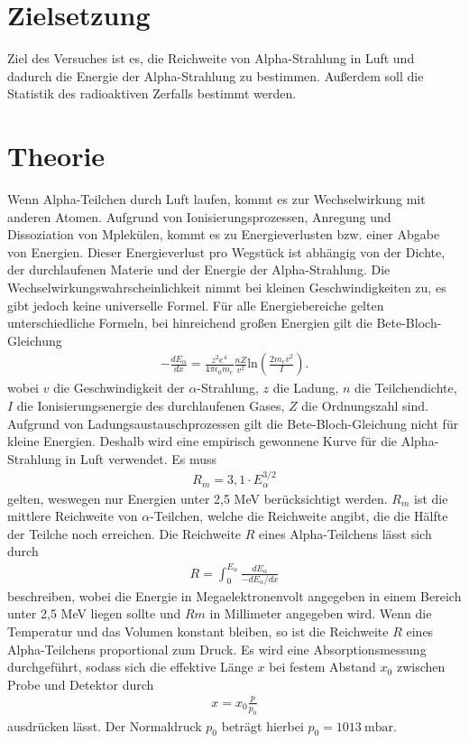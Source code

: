 \section{Zielsetzung}
\label{sec:Zielsetzung}

Ziel des Versuches ist es, die Reichweite von Alpha-Strahlung in Luft und dadurch die Energie der Alpha-Strahlung zu bestimmen.
Außerdem soll die Statistik des radioaktiven Zerfalls bestimmt werden.

\section{Theorie}
\label{sec:Theorie}

Wenn Alpha-Teilchen durch Luft laufen, kommt es zur Wechselwirkung mit anderen Atomen. Aufgrund von Ionisierungsprozessen, Anregung
und Dissoziation von Mplekülen, kommt es zu Energieverlusten bzw. einer Abgabe von Energien.
Dieser Energieverlust pro Wegstück ist abhängig von der Dichte, der durchlaufenen Materie und der Energie der Alpha-Strahlung.
Die Wechselwirkungswahrscheinlichkeit nimmt bei kleinen Geschwindigkeiten zu, es gibt jedoch keine universelle Formel.
Für alle Energiebereiche gelten unterschiedliche Formeln, bei hinreichend großen Energien gilt die Bete-Bloch-Gleichung
\begin{align}
    -\frac{dE_\alpha}{dx} = \frac{z^2e^4}{4 \pi \epsilon_0 m_e}\frac{nZ}{v^2}\text{ln}\left(\frac{2 m_e v^2}{I}\right).\label{eqn:Bete}
\end{align}
wobei $v$ die Geschwindigkeit der $\alpha$-Strahlung, $z$ die Ladung, $n$ die Teilchendichte, $I$ die Ionisierungsenergie des durchlaufenen Gases, $Z$ die Ordnungszahl sind.
Aufgrund von Ladungsaustauschprozessen gilt die Bete-Bloch-Gleichung nicht für kleine Energien.
Deshalb wird eine empirisch gewonnene Kurve für die Alpha-Strahlung in Luft verwendet.
Es muss
\begin{align}
   R_m=3,1 \cdot E_{\alpha}^{3/2} \label{eqn:Energiereichweite}
\end{align}
gelten, weswegen nur Energien unter 2,5 MeV berücksichtigt werden.
$R_m$ ist die mittlere Reichweite von $\alpha$-Teilchen, welche die Reichweite angibt, die die Hälfte der Teilche noch erreichen.
Die Reichweite $R$ eines Alpha-Teilchens lässt sich durch
\begin{align}
  R=  \int_0^{E_\alpha} \frac{dE_\alpha}{-dE_\alpha/dx} \label{eqn:Reichweite}
\end{align} 
beschreiben, wobei die Energie in Megaelektronenvolt angegeben in einem Bereich unter 2,5 MeV
liegen sollte und $Rm$ in Millimeter angegeben wird.
Wenn die Temperatur und das Volumen konstant bleiben, so ist die Reichweite $R$ eines Alpha-Teilchens proportional zum Druck.
Es wird eine Absorptionsmessung durchgeführt, sodass sich die effektive Länge $x$ bei festem Abstand $x_0$ zwischen Probe und Detektor
durch
\begin{align}
    x = x_0 \frac{p}{p_0} \label{eqn:x}
\end{align}
ausdrücken lässt. Der Normaldruck $p_0$ beträgt hierbei $p_0= \qty{1013}{\milli\bar}$.



